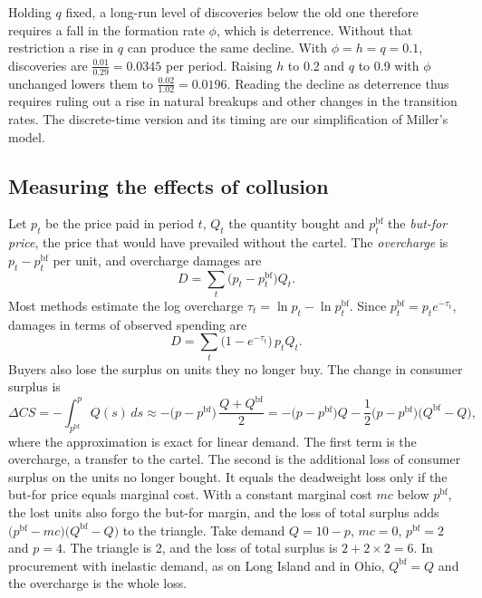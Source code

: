 \begin{remark}
\begin{equation*}
\end{equation*}
Holding $q$ fixed, a long-run level of discoveries below the old one therefore requires a fall in the formation
rate $\phi$, which is deterrence. Without that restriction a rise in $q$ can produce the same decline. With
$\phi = h = q = 0.1$, discoveries are $\frac{0.01}{0.29} = 0.0345$ per period. Raising $h$ to 0.2 and $q$ to 0.9
with $\phi$ unchanged lowers them to $\frac{0.02}{1.02} = 0.0196$. Reading the decline as deterrence thus requires
ruling out a rise in natural breakups and other changes in the transition rates. The discrete-time version and
its timing are our simplification of Miller's model.
\end{remark}

\subsection{Measuring the effects of collusion}\label{sec:13-damages}

Let $p_t$ be the price paid in period $t$, $Q_t$ the quantity bought and $p^{\mathrm{bf}}_t$ the \emph{but-for
price}, the price that would have prevailed without the cartel. The \emph{overcharge} is $p_t - p^{\mathrm{bf}}_t$
per unit, and overcharge damages are
\begin{equation}\label{eq:13-damages}
  D = \sum_t \bigl(p_t - p^{\mathrm{bf}}_t\bigr)Q_t .
\end{equation}
Most methods estimate the log overcharge $\tau_t = \ln p_t - \ln p^{\mathrm{bf}}_t$. Since
$p^{\mathrm{bf}}_t = p_te^{-\tau_t}$, damages in terms of observed spending are
\begin{equation}\label{eq:13-damages-log}
  D = \sum_t \bigl(1 - e^{-\tau_t}\bigr)\,p_tQ_t .
\end{equation}
Buyers also lose the surplus on units they no longer buy. The change in consumer surplus is
\begin{equation*}
  \Delta CS = -\int_{p^{\mathrm{bf}}}^{p}Q(s)\,ds \approx -\bigl(p - p^{\mathrm{bf}}\bigr)\,\frac{Q + Q^{\mathrm{bf}}}{2}
  = -\bigl(p - p^{\mathrm{bf}}\bigr)Q - \frac{1}{2}\bigl(p - p^{\mathrm{bf}}\bigr)\bigl(Q^{\mathrm{bf}} - Q\bigr) ,
\end{equation*}
where the approximation is exact for linear demand. The first term is the overcharge, a transfer to the cartel. The
second is the additional loss of consumer surplus on the units no longer bought. It equals the deadweight loss only
if the but-for price equals marginal cost. With a constant marginal cost $mc$ below $p^{\mathrm{bf}}$, the lost units
also forgo the but-for margin, and the loss of total surplus adds $\bigl(p^{\mathrm{bf}} - mc\bigr)\bigl(Q^{\mathrm{bf}}
- Q\bigr)$ to the triangle. Take demand $Q = 10 - p$, $mc = 0$, $p^{\mathrm{bf}} = 2$ and $p = 4$. The triangle is 2,
and the loss of total surplus is $2 + 2 \times 2 = 6$. In procurement with inelastic demand, as on Long Island and in Ohio,
$Q^{\mathrm{bf}} = Q$ and the overcharge is the whole loss.

